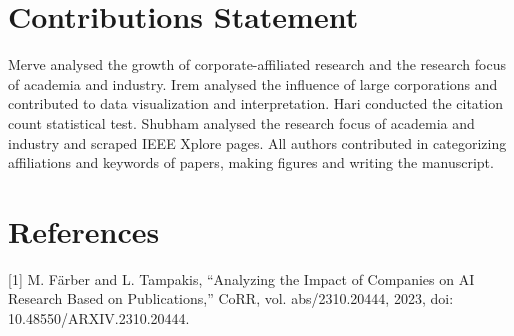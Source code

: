 \documentclass{article}
\begin{document}
\section{Contributions Statement}
\vspace{-7pt}
Merve analysed the growth of corporate-affiliated research and the research focus of academia and industry. Irem analysed the influence of large corporations and contributed to data visualization and interpretation. Hari conducted the citation count statistical test. Shubham analysed the research focus of academia and industry and scraped IEEE Xplore pages.  All authors contributed in categorizing affiliations and keywords of papers, making figures and writing the manuscript.



\newpage
\section*{References}

[1] M. Färber and L. Tampakis, “Analyzing the Impact of Companies on AI Research Based on Publications,” CoRR, vol. abs/2310.20444, 2023, doi: 10.48550/ARXIV.2310.20444.
\end{document}
